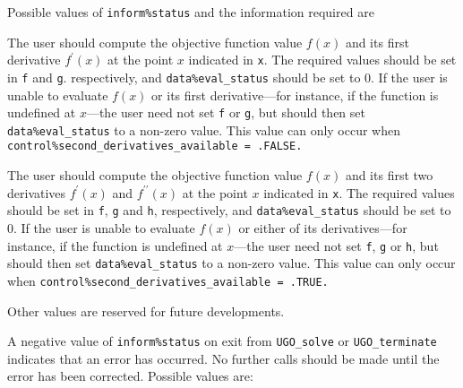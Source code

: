 \documentclass{galahad}
\newcommand{\packagename}{UGO}
\begin{document}
Possible values of {\tt inform\%status} and the information required are
\begin{description}
 The user should compute the objective function
     value $f(x)$ and its first derivative $f^{\prime}(x)$
     at the point $x$ indicated in {\tt x}.
     The required values should be set in {\tt f} and {\tt g}.
     respectively, and  {\tt data\%eval\_status} should be set to 0.
     If the user is unable to evaluate $f(x)$ or its
     first derivative---for instance, if the function is
     undefined at $x$---the user need not set {\tt f} or {\tt g},
     but should then set {\tt data\%eval\_status} to a non-zero value.
     This value can only occur when
     {\tt control\%second\_derivatives\_available = .FALSE.}

 The user should compute the objective function
     value $f(x)$ and its first two derivatives $f^{\prime}(x)$ and
     $f^{\prime\prime}(x)$ at the point $x$ indicated in {\tt x}.
     The required values should be set in {\tt f}, {\tt g} and {\tt h},
     respectively, and  {\tt data\%eval\_status} should be set to 0.
     If the user is unable to evaluate $f(x)$ or either of its
     derivatives---for instance, if the function is
     undefined at $x$---the user need not set {\tt f}, {\tt g} or {\tt h},
     but should then set {\tt data\%eval\_status} to a non-zero value.
     This value can only occur when
     {\tt control\%second\_derivatives\_available = .TRUE.}
\end{description}
Other values are reserved for future developments.


\galerrors
A negative value of {\tt inform\%status} on exit from
{\tt \packagename\_solve}
or
{\tt \packagename\_terminate}
indicates that an error has occurred. No further calls should be made
until the error has been corrected. Possible values are:
\end{document}
